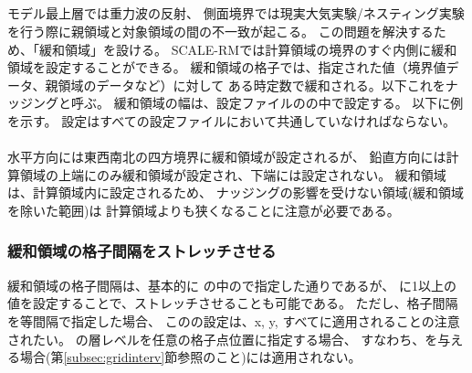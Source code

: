 \subsection{\SecBasicBufferSetting} \label{subsec:buffer}
モデル最上層では重力波の反射、
側面境界では現実大気実験/ネスティング実験を行う際に親領域と対象領域の間の不一致が起こる。
この問題を解決するため、「緩和領域」を設ける。
SCALE-RMでは計算領域の境界のすぐ内側に緩和領域を設定することができる。
緩和領域の格子では、指定された値（境界値データ、親領域のデータなど）に対して
ある時定数で緩和される。以下これをナッジングと呼ぶ。
緩和領域の幅は、設定ファイルのの中で設定する。
以下に例を示す。
設定はすべての設定ファイルにおいて共通していなければならない。\\

\\

水平方向には東西南北の四方境界に緩和領域が設定されるが、
鉛直方向には計算領域の上端にのみ緩和領域が設定され、下端には設定されない。
%
緩和領域は、計算領域内に設定されるため、
ナッジングの影響を受けない領域(緩和領域を除いた範囲)は
計算領域よりも狭くなることに注意が必要である。

\subsubsection{緩和領域の格子間隔をストレッチさせる}
緩和領域の格子間隔は、基本的に 
の中ので指定した通りであるが、
に1以上の値を設定することで、ストレッチさせることも可能である。
ただし、格子間隔を等間隔で指定した場合、
このの設定は、x, y, {\ZDIR}すべてに適用されることの注意されたい。
{\ZDIR}の層レベルを任意の格子点位置に指定する場合、
すなわち、を与える場合(第\ref{subsec:gridinterv}節参照のこと)には適用されない。

